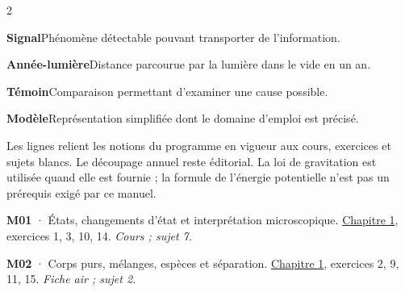 \begin{multicols}{2}
\par\addvspace{2mm}\noindent\begin{minipage}{\linewidth}\textbf{Signal}\enspace Phénomène détectable pouvant transporter de l’information.\par\end{minipage}\par
\par\addvspace{2mm}\noindent\begin{minipage}{\linewidth}\textbf{Année-lumière}\enspace Distance parcourue par la lumière dans le vide en un an.\par\end{minipage}\par
\par\addvspace{2mm}\noindent\begin{minipage}{\linewidth}\textbf{Témoin}\enspace Comparaison permettant d’examiner une cause possible.\par\end{minipage}\par
\par\addvspace{2mm}\noindent\begin{minipage}{\linewidth}\textbf{Modèle}\enspace Représentation simplifiée dont le domaine d’emploi est précisé.\par\end{minipage}\par
\end{multicols}\endgroup
{}
\label{programme}
Les lignes relient les notions du programme en vigueur aux cours, exercices et sujets blancs. Le découpage annuel reste éditorial. La loi de gravitation est utilisée quand elle est fournie ; la formule de l’énergie potentielle n’est pas un prérequis exigé par ce manuel.\par\vspace{2mm}
\par\noindent\begin{minipage}{\linewidth}\textbf{M01} · États, changements d’état et interprétation microscopique. \hyperref[chap-1]{Chapitre 1}, exercices 1, 3, 10, 14. \emph{Cours ; sujet 7.}\par\end{minipage}\par\vspace{2mm}
\par\noindent\begin{minipage}{\linewidth}\textbf{M02} · Corps purs, mélanges, espèces et séparation. \hyperref[chap-1]{Chapitre 1}, exercices 2, 9, 11, 15. \emph{Fiche air ; sujet 2.}\par\end{minipage}\par\vspace{2mm}
